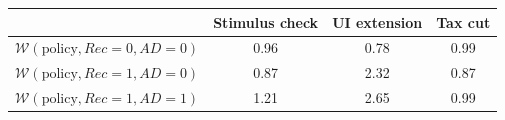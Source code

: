 \begin{tabular}{@{}lccc@{}} 
\toprule 
                          & Stimulus check      & UI extension    & Tax cut    \\  \midrule 
$\mathcal{W}(\text{policy}, Rec=0, AD=0)$ & 0.96  & 0.78  & 0.99     \\ 
$\mathcal{W}(\text{policy}, Rec=1, AD=0)$ & 0.87  & 2.32  & 0.87     \\ 
$\mathcal{W}(\text{policy}, Rec=1, AD=1)$ & 1.21  & 2.65  & 0.99     \\ \bottomrule 
\end{tabular}  
